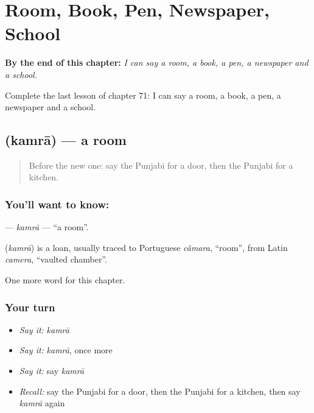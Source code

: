 
\chapter{Room, Book, Pen, Newspaper, School}
\label{ch:pa-room-book-pen-newspaper-school}

\begin{chapteropening}
\textbf{By the end of this chapter:} \emph{I can say a room, a book, a pen, a newspaper and a school.}

Complete the last lesson of chapter 71: I can say a room, a book, a pen, a newspaper and a school.
\end{chapteropening}

\section[\texorpdfstring{\pa{ਕਮਰਾ} (kamrā)}{ਕਮਰਾ (kamrā)}]{ (kamrā) — a room}

\label{lesson:PA-C71-kamra}



\begin{quote}
Before the new one: say the Punjabi for a door, then the Punjabi for a kitchen.
\end{quote}

\subsection*{You'll want to know: }
\textbf{} — \emph{kamrā} — \textquotedblleft{}a room\textquotedblright{}.

\begin{cousinweb}
\textbf{} (\emph{kamrā}) is a loan, usually traced to Portuguese \emph{câmara}, \textquotedblleft{}room\textquotedblright{}, from Latin \emph{camera}, \textquotedblleft{}vaulted chamber\textquotedblright{}.
\end{cousinweb}

\begin{grammarlens}[title={What you've built}]
One more word for this chapter.
\end{grammarlens}

\subsection*{Your turn}
\begin{itemize}
\raggedright
  \item \emph{Say it:} \emph{kamrā}
  \item \emph{Say it:} \emph{kamrā}, once more
  \item \emph{Say it:} say \emph{kamrā}
  \item \emph{Recall:} say the Punjabi for a door, then the Punjabi for a kitchen, then say \emph{kamrā} again
\end{itemize}

